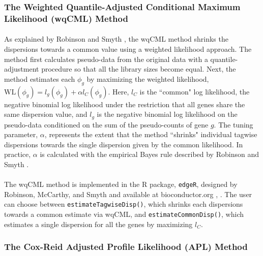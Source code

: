 \documentclass[10pt]{article}
\begin{document}
\subsubsection*{The Weighted Quantile-Adjusted Conditional Maximum Likelihood (wqCML) Method} \label{subsec:qcml}

\paragraph{} \indent As explained by Robinson and Smyth \cite{rs07}, the wqCML method shrinks the dispersions towards a common value using a weighted likelihood approach. The method first calculates pseudo-data from the original data with a quantile-adjustment procedure so that all the library sizes become equal. Next, the method estimates each $\phi_g$ by maximizing the weighted likelihood, $\text{WL}(\phi_g) = l_g(\phi_g) + \alpha l_C(\phi_g)$. Here, $l_C$ is the ``common" log likelihood, the negative binomial log likelihood under the restriction that all genes share the same dispersion value, and $l_g$ is the negative binomial log likelihood on the pseudo-data conditioned on the sum of the pseudo-counts of gene $g$. The tuning parameter, $\alpha$, represents the extent that the method ``shrinks" individual tagwise dispersions towards the single dispersion given by the common likelihood. In practice, $\alpha$ is calculated with the empirical Bayes rule described by Robinson and Smyth \cite{rs07}.

\paragraph{} \indent The wqCML method is implemented in the R package, {\tt edgeR}, designed by Robinson, McCarthy, and Smyth and available at {bioconductor.org} \cite{edger}, \cite{edger_m}. The user can choose between {\tt estimateTagwiseDisp()}, which shrinks each dispersions towards a common estimate via wqCML, and {\tt estimateCommonDisp()}, which estimates a single dispersion for all the genes by maximizing $l_C$.

\subsubsection*{The Cox-Reid Adjusted Profile Likelihood (APL) Method} \label{subsec:apl}
\end{document}
